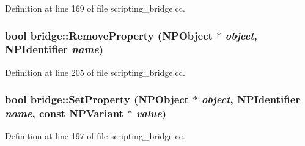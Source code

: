 Definition at line 169 of file scripting\_\-bridge.cc.

\hypertarget{namespacebridge_a1f8e83225badcdeba8cb594151ef4f7d}{
\subsubsection[{RemoveProperty}]{\setlength{\rightskip}{0pt plus 5cm}bool bridge::RemoveProperty (NPObject $\ast$ {\em object}, \/  NPIdentifier {\em name})}}
\label{namespacebridge_a1f8e83225badcdeba8cb594151ef4f7d}


Definition at line 205 of file scripting\_\-bridge.cc.

\hypertarget{namespacebridge_a3a8e9ff89a4e1fee4909b714d917d846}{
\subsubsection[{SetProperty}]{\setlength{\rightskip}{0pt plus 5cm}bool bridge::SetProperty (NPObject $\ast$ {\em object}, \/  NPIdentifier {\em name}, \/  const NPVariant $\ast$ {\em value})}}
\label{namespacebridge_a3a8e9ff89a4e1fee4909b714d917d846}


Definition at line 197 of file scripting\_\-bridge.cc.

